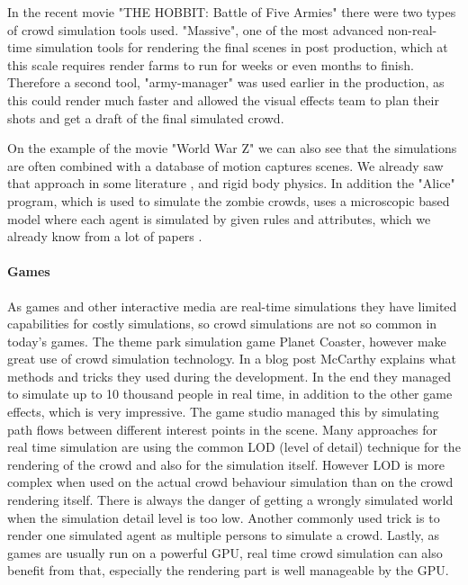 \documentclass{acmsiggraph}               %
\begin{document}
In the recent movie "THE HOBBIT: Battle of Five Armies" there were  two types of crowd simulation tools used. "Massive", one of the most advanced non-real-time simulation tools \cite{massive_website} for rendering the final scenes in post production, which at this scale requires render farms to run for weeks or even months to finish. Therefore a second tool, "army-manager" was used earlier in the production, as this could render much faster and allowed the visual effects team to plan their shots and get a draft of the final simulated crowd. \cite{wired_hobbit_doku}

On the example of the movie "World War Z" we can also see that the simulations are often combined with a database of motion captures scenes. We already saw that approach in some literature \cite{thalmann_crowd_2013}, and rigid body physics. In addition the "Alice" program, which is used to simulate the zombie crowds, uses a microscopic based model where each agent is simulated by given rules and attributes, which we already know from a lot of papers \cite{wired_worldwarz_doku}. 


\paragraph{Games}

As games and other interactive media are real-time simulations they have limited capabilities for costly simulations, so crowd simulations are not so common in today's games. The theme park simulation game Planet Coaster, however make great use of crowd simulation technology. In a blog post McCarthy  explains what methods and tricks they used during the development. In the end they managed to simulate up to 10 thousand people in real time, in addition to the other game effects, which is very impressive. The game studio managed this by simulating path flows between different interest points in the scene.   
Many approaches for real time simulation are using the common LOD (level of detail) technique for the rendering of the crowd and also for the simulation itself. However LOD is more complex when used on the actual crowd behaviour simulation than on the crowd rendering itself. There is always the danger of getting a wrongly simulated world when the simulation detail level is too low. Another commonly used trick is to render one simulated agent as multiple persons to simulate a crowd. Lastly, as games are usually run on a powerful GPU, real time crowd simulation can also benefit from that, especially the rendering part is well manageable by the GPU.
\end{document}

